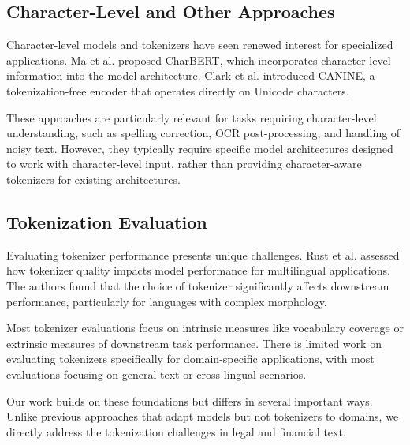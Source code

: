 \subsection{Character-Level and Other Approaches}

Character-level models and tokenizers have seen renewed interest for specialized applications. Ma et al. \cite{ma2020charbert} proposed CharBERT, which incorporates character-level information into the model architecture. Clark et al. \cite{clark2022canine} introduced CANINE, a tokenization-free encoder that operates directly on Unicode characters.

These approaches are particularly relevant for tasks requiring character-level understanding, such as spelling correction, OCR post-processing, and handling of noisy text. However, they typically require specific model architectures designed to work with character-level input, rather than providing character-aware tokenizers for existing architectures.

\subsection{Tokenization Evaluation}

Evaluating tokenizer performance presents unique challenges. Rust et al. \cite{rust2020good} assessed how tokenizer quality impacts model performance for multilingual applications. The authors found that the choice of tokenizer significantly affects downstream performance, particularly for languages with complex morphology.

Most tokenizer evaluations focus on intrinsic measures like vocabulary coverage or extrinsic measures of downstream task performance. There is limited work on evaluating tokenizers specifically for domain-specific applications, with most evaluations focusing on general text or cross-lingual scenarios.

Our work builds on these foundations but differs in several important ways. Unlike previous approaches that adapt models but not tokenizers to domains, we directly address the tokenization challenges in legal and financial text. 